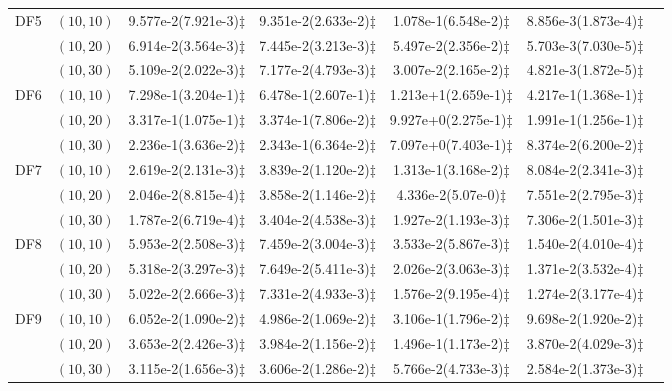 \documentclass[review]{elsarticle}
\begin{document}
\begin{table*}[!tbh]
{{\begin{tabular} {ccccccc}
\hline  \multirow{3}{*}{DF5}
&$(10,10)$ &9.577e-2(7.921e-3)$\ddagger$ &9.351e-2(2.633e-2)$\ddagger$ &1.078e-1(6.548e-2)$\ddagger$ &8.856e-3(1.873e-4)$\ddagger$ \\
&$(10,20)$ &6.914e-2(3.564e-3)$\ddagger$ &7.445e-2(3.213e-3)$\ddagger$ &5.497e-2(2.356e-2)$\ddagger$ &5.703e-3(7.030e-5)$\ddagger$ \\
&$(10,30)$ &5.109e-2(2.022e-3)$\ddagger$ &7.177e-2(4.793e-3)$\ddagger$ &3.007e-2(2.165e-2)$\ddagger$ &4.821e-3(1.872e-5)$\ddagger$ \\
\hline  \multirow{3}{*}{DF6}
&$(10,10)$ &7.298e-1(3.204e-1)$\ddagger$ &6.478e-1(2.607e-1)$\ddagger$ &1.213e+1(2.659e-1)$\ddagger$ &4.217e-1(1.368e-1)$\ddagger$ \\
&$(10,20)$ &3.317e-1(1.075e-1)$\ddagger$ &3.374e-1(7.806e-2)$\ddagger$ &9.927e+0(2.275e-1)$\ddagger$ &1.991e-1(1.256e-1)$\ddagger$ \\
&$(10,30)$ &2.236e-1(3.636e-2)$\ddagger$ &2.343e-1(6.364e-2)$\ddagger$ &7.097e+0(7.403e-1)$\ddagger$ &8.374e-2(6.200e-2)$\ddagger$ \\
\hline  \multirow{3}{*}{DF7}
&$(10,10)$ &2.619e-2(2.131e-3)$\ddagger$ &3.839e-2(1.120e-2)$\ddagger$ &1.313e-1(3.168e-2)$\ddagger$ &8.084e-2(2.341e-3)$\ddagger$ \\
&$(10,20)$ &2.046e-2(8.815e-4)$\ddagger$ &3.858e-2(1.146e-2)$\ddagger$ &4.336e-2(5.07e-0)$\ddagger$ &7.551e-2(2.795e-3)$\ddagger$ \\
&$(10,30)$ &1.787e-2(6.719e-4)$\ddagger$ &3.404e-2(4.538e-3)$\ddagger$ &1.927e-2(1.193e-3)$\ddagger$ &7.306e-2(1.501e-3)$\ddagger$ \\
\hline  \multirow{3}{*}{DF8}
&$(10,10)$ &5.953e-2(2.508e-3)$\ddagger$ &7.459e-2(3.004e-3)$\ddagger$ &3.533e-2(5.867e-3)$\ddagger$ &1.540e-2(4.010e-4)$\ddagger$ \\
&$(10,20)$ &5.318e-2(3.297e-3)$\ddagger$ &7.649e-2(5.411e-3)$\ddagger$ &2.026e-2(3.063e-3)$\ddagger$ &1.371e-2(3.532e-4)$\ddagger$ \\
&$(10,30)$ &5.022e-2(2.666e-3)$\ddagger$ &7.331e-2(4.933e-3)$\ddagger$ &1.576e-2(9.195e-4)$\ddagger$ &1.274e-2(3.177e-4)$\ddagger$ \\
\hline  \multirow{3}{*}{DF9}
&$(10,10)$ &6.052e-2(1.090e-2)$\ddagger$ &4.986e-2(1.069e-2)$\ddagger$ &3.106e-1(1.796e-2)$\ddagger$ &9.698e-2(1.920e-2)$\ddagger$ \\
&$(10,20)$ &3.653e-2(2.426e-3)$\ddagger$ &3.984e-2(1.156e-2)$\ddagger$ &1.496e-1(1.173e-2)$\ddagger$ &3.870e-2(4.029e-3)$\ddagger$ \\
&$(10,30)$ &3.115e-2(1.656e-3)$\ddagger$ &3.606e-2(1.286e-2)$\ddagger$ &5.766e-2(4.733e-3)$\ddagger$ &2.584e-2(1.373e-3)$\ddagger$ \\

\end{tabular}}}
\end{table*}
\end{document}
